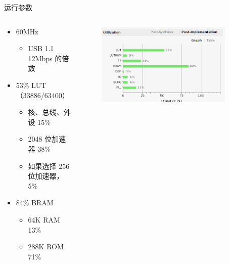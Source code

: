 \documentclass[aspectratio=169]{ctexbeamer}
\begin{document}
\begin{frame}{运行参数}
  \begin{columns}
    \begin{column}{0.5\textwidth}
      \begin{itemize}
        \item 60MHz\begin{itemize}
          \item USB 1.1 12Mbps 的倍数
        \end{itemize}
        \item 53\% LUT（33886/63400） \begin{itemize}
          \item 核、总线、外设 15\%
          \item 2048 位加速器 38\%
          \item 如果选择 256 位加速器，5\%
        \end{itemize}
        \item 84\% BRAM\begin{itemize}
          \item 64K RAM 13\%
          \item 288K ROM 71\%
        \end{itemize}
      \end{itemize}
    \end{column}
    \begin{column}{0.5\textwidth}
      \begin{figure}
        \includegraphics[width=0.9\textwidth]{img/utilization.png}
      \end{figure}
    \end{column}
  \end{columns}
\end{frame}
\end{document}
